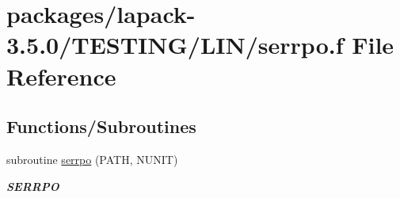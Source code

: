 \hypertarget{serrpo_8f}{}\section{packages/lapack-\/3.5.0/\+T\+E\+S\+T\+I\+N\+G/\+L\+I\+N/serrpo.f File Reference}
\label{serrpo_8f}
\subsection*{Functions/\+Subroutines}
\begin{DoxyCompactItemize}
\item 
subroutine \hyperlink{group__single__lin_ga0aabd070de73f57629e42c77ddbddd4c}{serrpo} (P\+A\+T\+H, N\+U\+N\+I\+T)
\begin{DoxyCompactList}\small\item\em {\bfseries S\+E\+R\+R\+P\+O} \end{DoxyCompactList}\end{DoxyCompactItemize}

